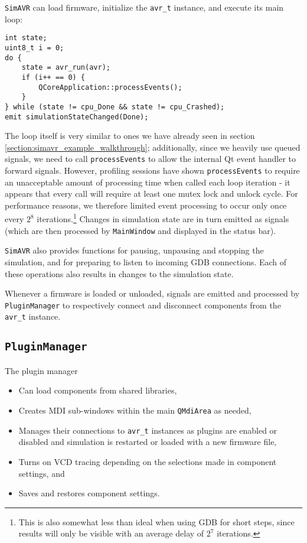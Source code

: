 \lstinline|SimAVR| can load firmware, initialize the \lstinline|avr_t| instance,
and execute its main loop:

\begin{lstlisting}
int state;
uint8_t i = 0;
do {
    state = avr_run(avr);
    if (i++ == 0) {
        QCoreApplication::processEvents();
    }
} while (state != cpu_Done && state != cpu_Crashed);
emit simulationStateChanged(Done);
\end{lstlisting}

The loop itself is very similar to ones we have already seen in section
\ref{section:simavr_example_walkthrough}; additionally, since we heavily use
queued signals, we need to call \lstinline|processEvents| to allow the internal
Qt event handler to forward signals. However, profiling sessions have shown
\lstinline|processEvents| to require an unacceptable amount of processing time
when called each loop iteration - it appears that every call will require at least
one mutex lock and unlock cycle. For performance reasons, we therefore limited
event processing to occur only once every $2^8$ iterations.\footnote{
%
This is also somewhat less than ideal when using \ac{GDB} for short steps, since
results will only be visible with an average delay of $2^7$ iterations.
%
}
Changes in simulation state are in turn
emitted as signals (which are then processed by \lstinline|MainWindow| and
displayed in the status bar).

\lstinline|SimAVR| also provides functions for pausing, unpausing and stopping the
simulation, and for preparing \simavr to listen to incoming \ac{GDB} connections.
Each of these operations also results in changes to the simulation state.

Whenever a firmware is loaded or unloaded, signals are emitted and processed
by \lstinline|PluginManager| to respectively connect and disconnect components
from the \lstinline|avr_t| instance.


\subsection{\lstinline|PluginManager|}

The plugin manager

\begin{itemize}
\item Can load components from shared libraries,
\item Creates \ac{MDI} sub-windows within the main \lstinline|QMdiArea| as needed,
\item Manages their connections to \lstinline|avr_t| instances as plugins are
      enabled or disabled and simulation is restarted or loaded with a new firmware
      file,
\item Turns on \ac{VCD} tracing depending on the selections made in component
      settings, and
\item Saves and restores component settings.
\end{itemize}

